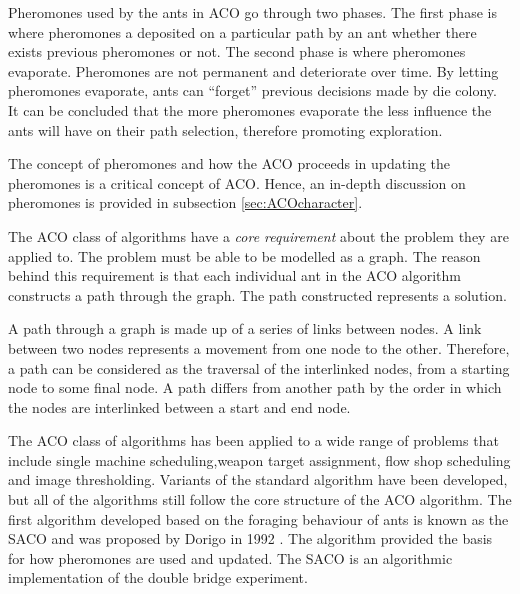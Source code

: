 Pheromones used by the ants in \gls{ACO} go through two phases. The first phase is where pheromones a deposited on a particular path by an ant whether there exists previous pheromones or not. The second phase is where pheromones evaporate. Pheromones are not permanent and deteriorate over time\cite{FundamentalSwarm}. By letting pheromones evaporate, ants can ``forget'' previous decisions made by die colony\cite{FundamentalSwarm}. It can be concluded that the more pheromones evaporate the less influence the ants will have on their path selection, therefore promoting exploration\cite{FundamentalSwarm}.

The concept of pheromones and how the \gls{ACO} proceeds in updating the pheromones is a critical concept of \gls{ACO}. Hence, an in-depth discussion on pheromones is provided in subsection \ref{sec:ACOcharacter}.

The \gls{ACO} class of algorithms have a \emph{core requirement} about the problem they are applied to\cite{FundamentalSwarm}. The problem must be able to be modelled as a graph. The reason behind this requirement is that each individual ant in the \gls{ACO} algorithm constructs a path through the graph\cite{FundamentalSwarm}. The path constructed represents a solution.

A path through a graph is made up of a series of links between nodes\cite{AIModernApproach,DataStructuresJava}. A link between two nodes represents a movement from one node to the other\cite{AIModernApproach,DataStructuresJava}. Therefore, a path can be considered as the traversal of the interlinked nodes, from a starting node to some final node\cite{AIModernApproach,DataStructuresJava}. A path differs from another path by the order in which the nodes are interlinked between a start and end node\cite{AIModernApproach,DataStructuresJava}.

 The \gls{ACO} class of algorithms has been applied to a wide range of problems that include single machine scheduling\cite{ACOSingleMachine},weapon target assignment\cite{WeaponTargetACO}, flow shop scheduling\cite{ACOFlowShop} and image thresholding\cite{ACOImageThreshold}. Variants of the standard algorithm have been developed, but all of the algorithms still follow the core structure of the \gls{ACO} algorithm\cite{CompuIntelligenceIntro,FundamentalSwarm}.
The first algorithm developed based on the foraging behaviour of ants is known as the \gls{SACO} and was proposed by Dorigo in 1992 \cite{CompuIntelligenceIntro}. The algorithm provided the basis for how pheromones are used and updated. The \gls{SACO} is an algorithmic implementation of the double bridge experiment.

